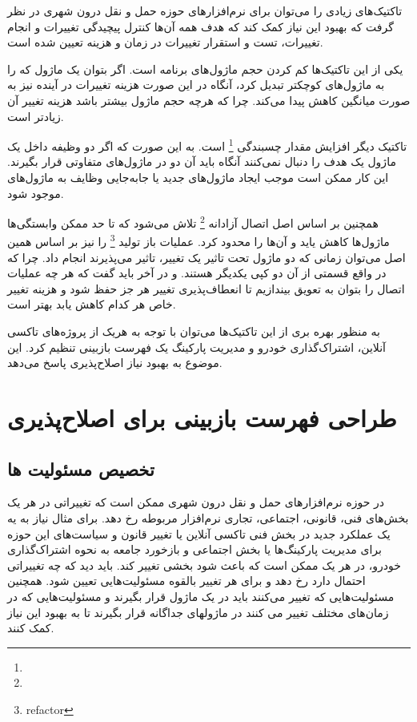  تاکتیک‌های زیادی را می‌توان برای نرم‌افزار‌های حوزه حمل و‌ نقل درون شهری در نظر گرفت که بهبود این نیاز کمک کند که هدف همه آن‌ها کنترل پیچیدگی تغییرات و انجام تغییرات، تست و استقرار تغییرات در زمان و هزینه تعیین شده است.

یکی از این تاکتیک‌ها کم کردن حجم ماژول‌های برنامه است. اگر بتوان یک ماژول که را به ماژول‌های کوچکتر تبدیل کرد، آنگاه در این صورت هزینه تغییرات در آینده نیز به صورت میانگین کاهش پیدا می‌کند.
چرا که هرچه حجم ماژول بیشتر باشد هزینه تغییر آن زیادتر است.

تاکتیک دیگر افزایش مقدار چسبندگی
\footnote{}
است. به این صورت که اگر دو وظیفه داخل یک ماژول یک هدف را دنبال نمی‌کنند آنگاه باید آن دو در ماژول‌های متفاوتی قرار بگیرند.
این کار ممکن است موجب ایجاد ماژول‌های جدید یا جابه‌جایی وظایف به ماژول‌های موجود شود.

همچنین بر اساس اصل اتصال آزادانه
\footnote{} 
تلاش می‌شود که تا حد ممکن وابستگی‌ها ماژول‌ها کاهش یاید و آن‌ها را محدود کرد. عملیات باز تولید
\footnote{refactor}
را نیز بر اساس همین اصل می‌توان زمانی که دو ماژول تحت تاثیر یک تغییر، تاثیر می‌پذیرند انجام داد. چرا که در واقع قسمتی از آن دو کپی یکدیگر هستند.
و در آخر باید گفت که هر چه عملیات اتصال را بتوان به تعویق بیندازیم تا انعطاف‌پذیری تغییر هر جز حفظ شود و هزینه تغییر خاص هر کدام کاهش یابد بهتر است.


به منظور بهره بری از این تاکتیک‌ها می‌توان با توجه به هریک از پروژه‌های تاکسی آنلاین، اشتراک‌گذاری خودرو و مدیریت پارکینگ یک فهرست بازبینی تنظیم کرد. این موضوع به بهبود نیاز اصلاح‌پذیری پاسخ می‌دهد.

\section{طراحی فهرست بازبینی برای اصلا‌ح‌پذیری}
\subsection{تخصیص مسئولیت ها} 
در حوزه نرم‌افزارهای حمل و نقل درون شهری ممکن است که تغییراتی در هر یک بخش‌های فنی، قانونی، اجتماعی، تجاری نرم‌افزار مربوطه رخ دهد. برای مثال نیاز به یه یک عملکرد جدید در بخش فنی تاکسی آنلاین یا تغییر قانون و سیاست‌های این حوزه برای مدیریت پارکینگ‌ها یا بخش اجتماعی و بازخورد جامعه به نحوه  اشتراک‌گذاری خودرو، در هر یک ممکن است که باعث شود بخشی تغییر کند. 
باید دید که چه تغییراتی احتمال دارد رخ دهد و برای هر تغییر بالقوه مسئولیت‌هایی تعیین شود. 
همچنین مسئولیت‌هایی که تغییر می‌کنند باید در یک ماژول قرار بگیرند و مسئولیت‌هایی که در زمان‌های مختلف تغییر می کنند در ماژولهای جداگانه قرار بگیرند تا به بهبود این نیاز کمک کنند.

